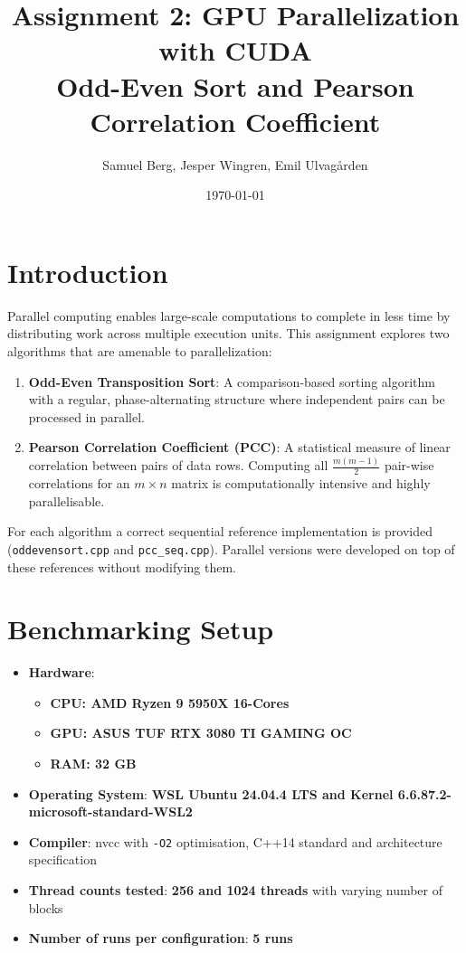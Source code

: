 \documentclass[11pt,a4paper]{article}
\title{Assignment 2: GPU Parallelization with CUDA\\
Odd-Even Sort and Pearson Correlation Coefficient}
\author{Samuel Berg, Jesper Wingren, Emil Ulvagården}
\date{\today}
\begin{document}
\maketitle

\tableofcontents

\newpage
\section{Introduction}

Parallel computing enables large-scale computations to complete in less time by distributing work across multiple execution units. This assignment explores two algorithms that are amenable to parallelization:

\begin{enumerate}
    \item \textbf{Odd-Even Transposition Sort}: A comparison-based sorting algorithm with a
          regular, phase-alternating structure where independent pairs can be processed in parallel.
    \item \textbf{Pearson Correlation Coefficient (PCC)}: A statistical measure of linear
          correlation between pairs of data rows. Computing all $\frac{m(m-1)}{2}$ pair-wise
          correlations for an $m \times n$ matrix is computationally intensive and highly
          parallelisable.
\end{enumerate}

For each algorithm a correct sequential reference implementation is provided
(\texttt{oddevensort.cpp} and \texttt{pcc\_seq.cpp}). Parallel versions were developed on top of
these references without modifying them.

\section{Benchmarking Setup}

\begin{itemize}
    \item \textbf{Hardware}:
    \begin{itemize}
        \item \textbf{CPU: AMD Ryzen 9 5950X 16-Cores}
        \item \textbf{GPU: ASUS TUF RTX 3080 TI GAMING OC}
        \item \textbf{RAM: 32 GB}
    \end{itemize}
    \item \textbf{Operating System}: \textbf{WSL Ubuntu 24.04.4 LTS and Kernel 6.6.87.2-microsoft-standard-WSL2}
    \item \textbf{Compiler}: nvcc with \texttt{-O2} optimisation, C++14 standard and architecture specification
    \item \textbf{Thread counts tested}: \textbf{256 and 1024 threads} with varying number of blocks
    \item \textbf{Number of runs per configuration}: \textbf{5 runs}
\end{itemize}
\end{document}
